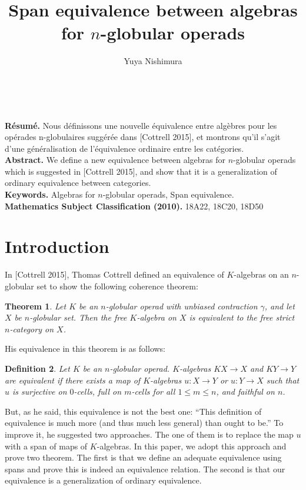 \documentclass[12pt]{article}
\theoremstyle{plain}
\newtheorem{theorem}{Theorem}[section]
\newtheorem{definition}[theorem]{Definition}
\theoremstyle{definition}
\begin{document}
\title{Span equivalence between algebras for $n$-globular operads}
\author{Yuya Nishimura}
\maketitle

\newpage


\mbox{ }
\vspace{35mm}


\begin{minipage}{118mm}{\small{\bf R\'esum\'e.} Nous d\'efinissons une nouvelle \'equivalence entre alg\`ebres pour les
op\'erades n-globulaires sugg\'er\'ee dans [Cottrell 2015], et montrons qu'il s'agit d'une g\'en\'eralisation de l'\'equivalence ordinaire entre les cat\'egories.\\
{\bf Abstract.} We define a new equivalence between algebras for $n$-globular operads which is suggested in [Cottrell 2015], and show that it is a generalization of ordinary equivalence between categories.\\
{\bf Keywords.} Algebras for $n$-globular operads, Span equivalence.\\
{\bf Mathematics Subject Classification (2010).} 18A22, 18C20, 18D50
}\end{minipage}


\section{Introduction}
In [Cottrell 2015], Thomas Cottrell  defined an equivalence of $K$-algebras on an $n$-globular set to show the following coherence theorem:
\begin{theorem}
Let $K$ be an $n$-globular operad with unbiased contraction $\gamma$, and let $X$ be $n$-globular set.
Then the free $K$-algebra on $X$ is equivalent to the free strict $n$-category on $X$.
\end{theorem}
His equivalence in this theorem is as follows:
\begin{definition}
Let $K$ be an $n$-globular operad. $K$-algebras $KX \rightarrow X$ and $KY \rightarrow Y$ are equivalent if there exists a map of $K$-algebras $u:X \rightarrow Y$ or $u:Y \rightarrow X$ such that $u$ is surjective on $0$-cells, full on $m$-cells for all $1 \leq m \leq n$, and faithful on $n$.
\end{definition}
But, as he said, this equivalence is not the best one: ``This definition of equivalence is much more (and thus much less general) than ought to be.'' To improve it, he suggested two approaches. The one of them is to replace the map $u$ with a span of maps of $K$-algebras. In this paper, we adopt this approach and prove two theorem. The first is that we define an adequate equivalence using spans
and prove this is indeed an equivalence relation. The second is that our equivalence is a generalization of ordinary equivalence.
\end{document}
